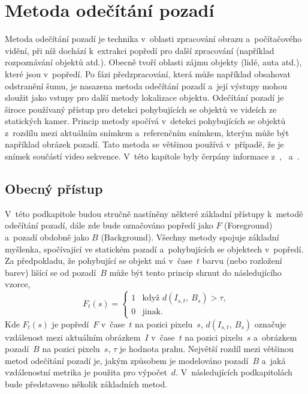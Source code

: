 


\section{Metoda odečítání pozadí}
\label{sec:background_subtraction}

\par{Metoda odečítání pozadí je technika v~oblasti zpracování obrazu a~po\-čí\-ta\-čo\-vé\-ho vidění, při níž dochází k~extrakci popředí pro další zpracování (například rozpoznávání objektů atd.). Obecně tvoří oblasti zájmu objekty (lidé, auta atd.), které jsou v~popředí. Po fázi předzpracování, která může například obsahovat odstranění šumu, je nasazena metoda odečítání pozadí a~její výstupy mohou sloužit jako vstupy pro další metody lokalizace objektu. Odečítání pozadí je široce používaný přístup pro detekci pohybujících se objektů ve videích ze statických kamer. Princip metody spočívá v~detekci pohybujících se objektů z~rozdílu mezi aktuálním snímkem a~referenčním snímkem, kterým může být například obrázek pozadí. Tato metoda se většinou používá v~případě, že je snímek součástí video sekvence. V~této kapitole byly čerpány informace z~\cite{sonka2008image},~\cite{Benezeth} a~\cite{BS03}.}









\subsection{Obecný přístup}
\label{sec:obecny_pristupy}

\par{V~této podkapitole budou stručně nastíněny některé základní přístupy k~metodě odečítání pozadí, dále zde bude označováno popředí jako $F$ (Foreground) a~pozadí obdobně jako $B$ (Background). Všechny metody spojuje základní myšlenka, spočívající ve statickém pozadí a~pohybujících se objektech v~popředí. Za před\-po\-kla\-du, že pohybující se objekt má v~čase~$t$ barvu (nebo rozložení barev) lišící se od pozadí~$B$ může být tento princip shrnut do následujícího vzorce,
\begin{equation}
	{F_t (s)} = \left\{
	\begin{array}{ll}
		1 & \textrm{když $d(I_{s,t},~B_s) > \tau$,}\\
		0 & \textrm{jinak.}
	\end{array} \right.
\end{equation}
Kde $F_t (s)$ je popředí~$F$ v~čase~$t$ na pozici pixelu~$s$, $d(I_{s,t},~B_s)$ označuje vzdálenost mezi aktuálním obrázkem~$I$ v~čase~$t$ na pozici pixelu~$s$ a~obrázkem pozadí~$B$ na pozici pixelu~$s$, $\tau$ je hodnota prahu. Největší rozdíl mezi většinou metod odečítání pozadí je, jakým způsobem je modelováno pozadí~$B$ a~jaká vzdálenostní metrika je použita pro výpočet~$d$. V~následujících podkapitolách bude představeno několik základních metod.}








